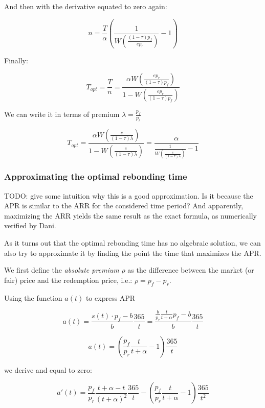 \documentclass{article}
\begin{document}
And then with the derivative equated to zero again:

\[
n = \frac{T}{\alpha} \left(\frac{1}{W\left(\frac{(1-\tau)p_f}{e p_r} \right)} - 1\right)
\]

Finally:

\begin{equation}
  \label{}
T_{opt} = \frac{T}{n} = \frac{\alpha W\left(\frac{e p_r}{(1-\tau)p_f}\right)}{1 - W\left(\frac{e p_r}{(1-\tau)p_f}\right)}
\end{equation}

We can write it in terms of premium $\lambda = \frac{p_f}{p_r}$

\begin{equation}
  \label{eq:opt-rebonding}
T_{opt} = \frac{\alpha W\left(\frac{e}{(1-\tau)\lambda}\right)}{1 - W\left(\frac{e}{(1-\tau)\lambda}\right)} = \frac{\alpha}{\frac{1}{W\left(\frac{e}{(1-\tau)\lambda}\right)} - 1}
\end{equation}

\subsubsection{Approximating the optimal rebonding time}
TODO: give some intuition why this is a good approximation. Is it because the APR is similar to the ARR for the considered time period? And apparently, maximizing the ARR yields the same result as the exact formula, as numerically verified by Dani.

As it turns out that the optimal rebonding time has no algebraic solution, we can also try to approximate it by finding the point the time that maximizes the APR.

We first define the \textit{absolute premium} $\rho$ as the difference between the market (or fair) price and the redemption price, i.e.: $\rho = p_f - p_r$.

Using the function $a(t)$ to express APR

\[
a(t) = \frac{s(t) \cdot p_f - b}{b} \frac{365}{t} = \frac{\frac{b}{p_r} \frac{t}{t+\alpha} p_f - b}{b} \frac{365}{t}
\]

\begin{equation}
  \label{eq:apr}
a(t) = \left(\frac{p_f}{p_r} \frac{t}{t+\alpha} - 1\right) \frac{365}{t}
\end{equation}

we derive and equal to zero:

\[
a'(t) = \frac{p_f}{p_r} \frac{t + \alpha - t}{(t+\alpha)^2} \frac{365}{t} - \left(\frac{p_f}{p_r} \frac{t}{t+\alpha} - 1\right) \frac{365}{t^2}
\]
\end{document}
